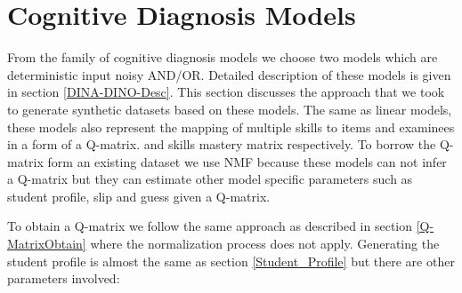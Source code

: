 








\section{Cognitive Diagnosis Models}

From the family of cognitive diagnosis models we choose two models which are deterministic input noisy AND/OR. Detailed description of these models is given in section \ref{DINA-DINO-Desc}. This section discusses the approach that we took to generate synthetic datasets based on these models. The same as linear models, these models also represent the mapping of multiple skills to items and examinees in a form of a Q-matrix. and skills mastery matrix respectively. To borrow the Q-matrix form an existing dataset we use NMF because these models can not infer a Q-matrix but they can estimate other model specific parameters such as student profile, slip and guess given a Q-matrix. 


To obtain a Q-matrix we follow the same approach as described in section \ref{Q-MatrixObtain} where the normalization process does not apply.  Generating the student profile is almost the same as section \ref{Student_Profile} but there are other parameters involved:


